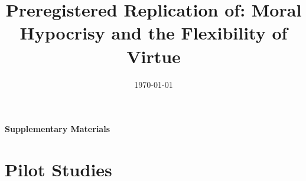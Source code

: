 \documentclass[12pt,]{article}
\title{Preregistered Replication of: Moral Hypocrisy and the Flexibility of Virtue}
\author{}
\date{\today}
\begin{document}

\sloppy
\raggedbottom




\appendix
\begin{center}
\LARGE\bfseries Supplementary Materials
\end{center}

\tableofcontents



\newpage
\section{Pilot Studies}
\label{appendix:pilot}
\end{document}
